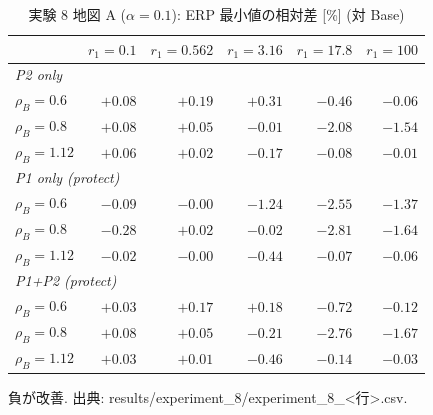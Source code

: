 \begin{table}[tbp]
\centering
\caption{実験 8 地図 A ($\alpha=0.1$): ERP 最小値の相対差 [\%] (対 Base)}
\label{tab:exp8-mapa}
\small
\begin{tabular}{lrrrrr}
\toprule
 & $r_1=0.1$ & $r_1=0.562$ & $r_1=3.16$ & $r_1=17.8$ & $r_1=100$ \\
\midrule
\multicolumn{6}{l}{\textit{P2 only}} \\
$\rho_B=0.6$ & $+0.08$ & $+0.19$ & $+0.31$ & $-0.46$ & $-0.06$ \\
$\rho_B=0.8$ & $+0.08$ & $+0.05$ & $-0.01$ & $-2.08$ & $-1.54$ \\
$\rho_B=1.12$ & $+0.06$ & $+0.02$ & $-0.17$ & $-0.08$ & $-0.01$ \\
\multicolumn{6}{l}{\textit{P1 only (protect)}} \\
$\rho_B=0.6$ & $-0.09$ & $-0.00$ & $-1.24$ & $-2.55$ & $-1.37$ \\
$\rho_B=0.8$ & $-0.28$ & $+0.02$ & $-0.02$ & $-2.81$ & $-1.64$ \\
$\rho_B=1.12$ & $-0.02$ & $-0.00$ & $-0.44$ & $-0.07$ & $-0.06$ \\
\multicolumn{6}{l}{\textit{P1+P2 (protect)}} \\
$\rho_B=0.6$ & $+0.03$ & $+0.17$ & $+0.18$ & $-0.72$ & $-0.12$ \\
$\rho_B=0.8$ & $+0.08$ & $+0.05$ & $-0.21$ & $-2.76$ & $-1.67$ \\
$\rho_B=1.12$ & $+0.03$ & $+0.01$ & $-0.46$ & $-0.14$ & $-0.03$ \\
\bottomrule
\end{tabular}
\par\smallskip
\footnotesize 負が改善. 出典: results/experiment\_8/experiment\_8\_<行>.csv.
\end{table}
